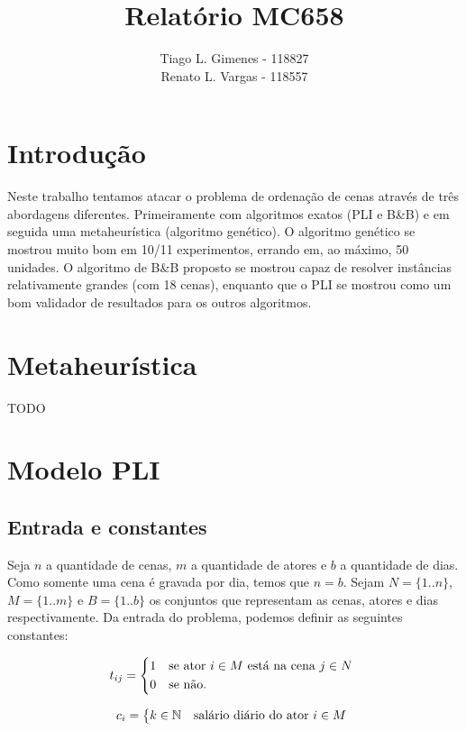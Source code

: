 \documentclass[a4paper,11pt]{article}
\title{Relatório MC658}
\author{Tiago L. Gimenes - 118827\\
        Renato L. Vargas - 118557}
\begin{document}
\maketitle

\section*{Introdução}
Neste trabalho tentamos atacar o problema de ordenação de cenas através de três
abordagens diferentes. Primeiramente com algoritmos exatos (PLI e B\&B) e em seguida
uma metaheurística (algoritmo genético). O algoritmo genético se mostrou muito bom
em 10/11 experimentos, errando em, ao máximo, 50 unidades. O algoritmo de B\&B
proposto se mostrou capaz de resolver instâncias relativamente grandes (com 18 cenas),
enquanto que o PLI se mostrou como um bom validador de resultados para os outros
algoritmos.

\section{Metaheurística}
TODO

\section{Modelo PLI}
\subsection{Entrada e constantes}
Seja $n$ a quantidade de cenas, $m$ a quantidade de atores e $b$ a quantidade de
dias. Como somente uma cena é gravada por dia, temos que $n = b$. Sejam $N=\{1..n\}$,
$M = \{1..m\}$ e $B=\{1..b\}$ os conjuntos que representam as cenas, atores e dias
respectivamente. Da entrada do problema, podemos definir as seguintes constantes:

\begin{equation}
  t_{ij} = \begin{dcases*}
              1 & se ator $i \in M$ está na cena $j \in N$ \\
              0 & se não.
           \end{dcases*}
  \label{tij}
\end{equation}

\begin{equation}
  c_{i} = \begin{dcases*} k \in \mathbb{N} & salário diário do ator $i \in M$ \end{dcases*}
\end{equation}
\end{document}
